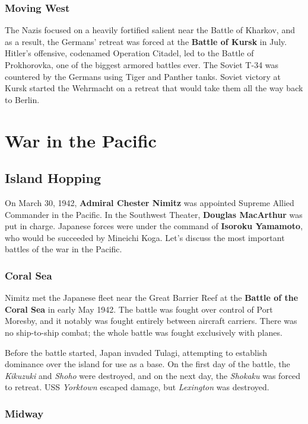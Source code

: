 \subsubsection*{Moving West}

The Nazis focused on a heavily fortified salient near the Battle of Kharkov,
and as a result, the Germans' retreat was forced at the \textbf{Battle of Kursk} in July.
Hitler's offensive, codenamed Operation Citadel,
led to the Battle of Prokhorovka, one of the biggest armored battles ever.
The Soviet T-34 was countered by the Germans using Tiger and Panther tanks.
Soviet victory at Kursk started the Wehrmacht on a retreat that would take them all the way back to Berlin.

\section{War in the Pacific}

\subsection*{Island Hopping}

On March 30, 1942, \textbf{Admiral Chester Nimitz} was appointed Supreme Allied Commander in the Pacific.
In the Southwest Theater, \textbf{Douglas MacArthur} was put in charge.
Japanese forces were under the command of \textbf{Isoroku Yamamoto}, who would be succeeded by Mineichi Koga.
Let's discuss the most important battles of the war in the Pacific.

\subsubsection*{Coral Sea}

Nimitz met the Japanese fleet near the Great Barrier Reef at the \textbf{Battle of the Coral Sea}
in early May 1942.
The battle was fought over control of Port Moresby, and it notably was fought entirely between aircraft carriers.
There was no ship-to-ship combat; the whole battle was fought exclusively with planes.

Before the battle started, Japan invaded Tulagi,
attempting to establish dominance over the island for use as a base.
On the first day of the battle, the \textit{Kikuzuki} and \textit{Shoho} were destroyed,
and on the next day, the \textit{Shokaku} was forced to retreat.
USS \textit{Yorktown} escaped damage, but \textit{Lexington} was destroyed.

\subsubsection*{Midway}

